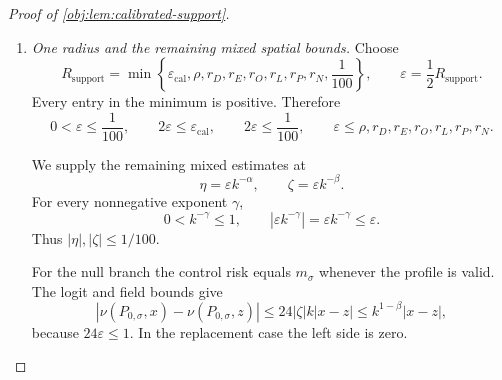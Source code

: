 \begin{proof}[Proof of \cref{obj:lem:calibrated-support}]
\begin{enumerate}
Define
\[
r_N=\min\left\{r_{\mathrm q},\frac1{100},
 \frac{r_{\mathrm{ctrl}}}{3},
 \frac1{C_{\mathrm{ctrl}}(9+2B_{\mathrm q})}\right\}>0.
\]
For \((\alpha,\beta)\in\mathcal D\), we have
\(0<\beta<\alpha\le1\). At the rate-scaled amplitudes with
\(0<\varepsilon_{\mathrm{amp}}\le r_N\),
\[
0\le\eta_{\mathrm{amp}}\le\zeta_{\mathrm{amp}}
\le r_N.
\]
Moreover,
\[
32|\eta_{\mathrm{amp}}\zeta_{\mathrm{amp}}|
\le\frac{32}{100}r_N\le r_{\mathrm{ctrl}},
\qquad
\frac52|\eta_{\mathrm{amp}}|\le r_{\mathrm{ctrl}},
\qquad
2|\zeta_{\mathrm{amp}}|\le r_{\mathrm{ctrl}}.
\]
The control-logit comparison therefore applies to the alternative margins. The two margin differences obey
\[
\begin{aligned}
|e_1(x)-e_1(z)|
&\le|\eta_{\mathrm{amp}}|(5+2B_{\mathrm q})k|x-z|,\\
|m_\sigma(x)-m_\sigma(z)|
&\le4|\zeta_{\mathrm{amp}}|k|x-z|.
\end{aligned}
\]
For a valid table, its control risk is
\[
\mu_0(x)=m_\sigma(x)-\frac{c_1(x)}{1-e_1(x)}.
\]
Using \(\eta_{\mathrm{amp}}\le\zeta_{\mathrm{amp}}\) gives
\[
\begin{aligned}
|\nu(P_{1,\sigma},x)-\nu(P_{1,\sigma},z)|
&\le C_{\mathrm{ctrl}}(9+2B_{\mathrm q})
       \zeta_{\mathrm{amp}}k|x-z|\\
&\le k^{1-\beta}|x-z|.
\end{aligned}
\]
The replacement case again has zero prognosis logit.

\item \textit{One radius and the remaining mixed spatial bounds.}
Choose
\[
R_{\mathrm{support}}
=\min\left\{\varepsilon_{\mathrm{cal}},\rho,r_D,r_E,r_O,r_L,
                         r_P,r_N,\frac1{100}\right\},
\qquad
\varepsilon=\frac12R_{\mathrm{support}}.
\]
Every entry in the minimum is positive. Therefore
\[
0<\varepsilon\le\frac1{100},
\qquad
2\varepsilon\le\varepsilon_{\mathrm{cal}},
\qquad
2\varepsilon\le\frac1{100},
\qquad
\varepsilon\le\rho,r_D,r_E,r_O,r_L,r_P,r_N.
\]

We supply the remaining mixed estimates at
\[
\eta=\varepsilon k^{-\alpha},
\qquad
\zeta=\varepsilon k^{-\beta}.
\]
For every nonnegative exponent \(\gamma\),
\[
0<k^{-\gamma}\le1,
\qquad
|\varepsilon k^{-\gamma}|=\varepsilon k^{-\gamma}\le\varepsilon.
\]
Thus \(|\eta|,|\zeta|\le1/100\).

For the null branch the control risk equals \(m_\sigma\) whenever the profile is valid. The logit and field bounds give
\[
|\nu(P_{0,\sigma},x)-\nu(P_{0,\sigma},z)|
\le24|\zeta|k|x-z|
\le k^{1-\beta}|x-z|,
\]
because \(24\varepsilon\le1\). In the replacement case the left side is zero.


\end{enumerate}
\end{proof}
